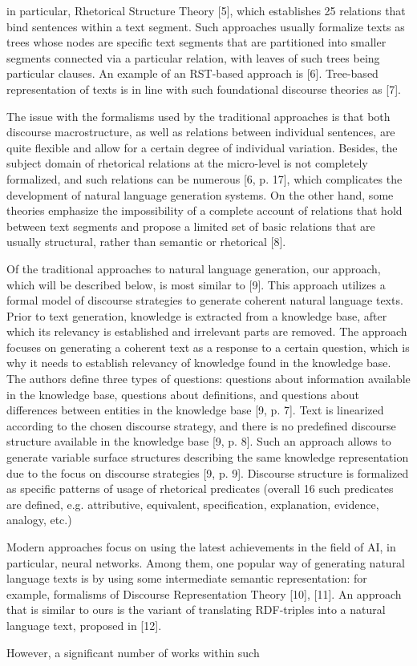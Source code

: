 \documentclass[9pt, a4paper]{article}
\begin{document}
\newpage
\begin{minipage}{0.48\textwidth}
\vspace{10mm}
in particular, Rhetorical Structure Theory [5], which
establishes 25 relations that bind sentences within a text
segment. Such approaches usually formalize texts as trees
whose nodes are specific text segments that are partitioned into smaller segments connected via a particular
relation, with leaves of such trees being particular clauses.
An example of an RST-based approach is [6]. Tree-based
representation of texts is in line with such foundational
discourse theories as [7].
\parindent 2mm

The issue with the formalisms used by the traditional
approaches is that both discourse macrostructure, as well
as relations between individual sentences, are quite flexible and allow for a certain degree of individual variation.
Besides, the subject domain of rhetorical relations at
the micro-level is not completely formalized, and such
relations can be numerous [6, p. 17], which complicates
the development of natural language generation systems.
On the other hand, some theories emphasize the impossibility of a complete account of relations that hold
between text segments and propose a limited set of basic
relations that are usually structural, rather than semantic
or rhetorical [8].


Of the traditional approaches to natural language generation, our approach, which will be described below,
is most similar to [9]. This approach utilizes a formal
model of discourse strategies to generate coherent natural
language texts. Prior to text generation, knowledge is
extracted from a knowledge base, after which its relevancy is established and irrelevant parts are removed.
The approach focuses on generating a coherent text as
a response to a certain question, which is why it needs
to establish relevancy of knowledge found in the knowledge base. The authors define three types of questions:
questions about information available in the knowledge
base, questions about definitions, and questions about
differences between entities in the knowledge base [9,
p. 7]. Text is linearized according to the chosen discourse
strategy, and there is no predefined discourse structure
available in the knowledge base [9, p. 8]. Such an
approach allows to generate variable surface structures
describing the same knowledge representation due to the
focus on discourse strategies [9, p. 9]. Discourse structure
is formalized as specific patterns of usage of rhetorical
predicates (overall 16 such predicates are defined, e.g. attributive, equivalent, specification, explanation, evidence,
analogy, etc.)


Modern approaches focus on using the latest achievements in the field of AI, in particular, neural networks.
Among them, one popular way of generating natural
language texts is by using some intermediate semantic
representation: for example, formalisms of Discourse
Representation Theory [10], [11]. An approach that is
similar to ours is the variant of translating RDF-triples
into a natural language text, proposed in [12].


However, a significant number of works within such
\end{minipage}
\end{document}
